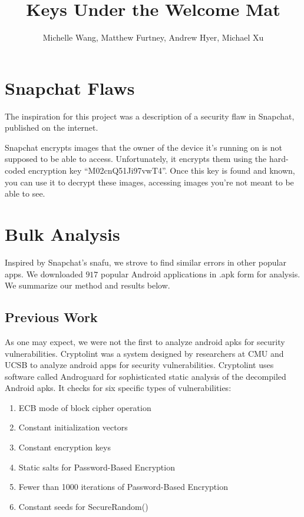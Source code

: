 \documentclass[11pt]{article}
\title{Keys Under the Welcome Mat}
\author{Michelle Wang, Matthew Furtney, Andrew Hyer, Michael Xu}
\numberwithin{theorem}{subsection}
\begin{document}
\maketitle

\section{Snapchat Flaws}

The inspiration for this project was a description of a security flaw in Snapchat, published on the internet.\cite{1}

Snapchat encrypts images that the owner of the device it's running on is not supposed to be able to access.  Unfortunately,
it encrypts them using the hard-coded encryption key ``M02cnQ51Ji97vwT4''.  Once this key is found and known, you can use it
to decrypt these images, accessing images you're not meant to be able to see.

\section{Bulk Analysis}

  Inspired by Snapchat's snafu, we strove to find similar errors in other popular apps. We downloaded
$917$ popular Android applications in .apk form for analysis. We summarize our method and results below.

\subsection{Previous Work}

  As one may expect, we were not the first to analyze android apks for security vulnerabilities.
Cryptolint was a system designed by researchers at CMU and UCSB to analyze android apps for security vulnerabilities. 
Cryptolint uses software called Androguard for sophisticated static analysis of the decompiled Android apks.
It checks for six specific types of vulnerabilities: 

\begin{enumerate}
  \item ECB mode of block cipher operation
  \item Constant initialization vectors
  \item Constant encryption keys
  \item Static salts for Password-Based Encryption
  \item Fewer than 1000 iterations of Password-Based Encryption
  \item Constant seeds for SecureRandom()
\end{enumerate}
\end{document}
